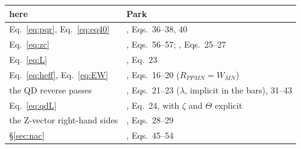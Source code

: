 \documentclass[11pt]{article}
\begin{document}
\begin{center}
\small
\begin{tabular}{@{}ll@{}}
\toprule
here & Park \\
\midrule
Eq.~\eqref{eq:pqr}, Eq.~\eqref{eq:eq40} & \cite{park2019}, Eqs.~36--38, 40 \\
Eq.~\eqref{eq:zc} & \cite{park2019}, Eqs.~56--57; \cite{park2020}, Eqs.~25--27 \\
Eq.~\eqref{eq:L} & \cite{park2019}, Eq.~23 \\
Eq.~\eqref{eq:heff}, Eq.~\eqref{eq:EW} & \cite{park2020}, Eqs.~16--20 ($R_{PPMN} = W_{MN}$) \\
the QD reverse passes & \cite{park2020}, Eqs.~21--23 ($\lambda$, implicit in the bars), 31--43 \\
Eq.~\eqref{eq:qdL} & \cite{park2020}, Eq.~24, with $\zeta$ and $\Theta$ explicit \\
the Z-vector right-hand sides & \cite{park2020}, Eqs.~28--29 \\
\S\ref{sec:nac} & \cite{park2020}, Eqs.~45--54 \\
\bottomrule
\end{tabular}
\end{center}
\end{document}
